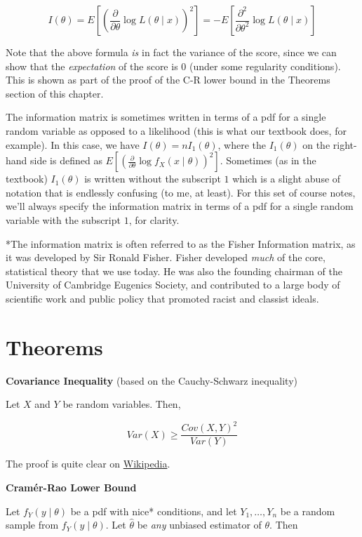 \documentclass[
  letterpaper,
  DIV=11,
  numbers=noendperiod]{scrreprt}
\begin{document}
\[
I(\theta) = E \left[ \left( \frac{\partial}{\partial \theta} \log L(\theta \mid x) \right)^2\right] = -E\left[ \frac{\partial^2}{\partial \theta^2} \log L(\theta \mid x)\right]
\]

Note that the above formula \emph{is} in fact the variance of the score,
since we can show that the \emph{expectation} of the score is 0 (under
some regularity conditions). This is shown as part of the proof of the
C-R lower bound in the Theorems section of this chapter.

The information matrix is sometimes written in terms of a pdf for a
single random variable as opposed to a likelihood (this is what our
textbook does, for example). In this case, we have
\(I(\theta) = n I_1(\theta)\), where the \(I_1(\theta)\) on the
right-hand side is defined as
\(E \left[ \left( \frac{\partial}{\partial \theta} \log f_X(x \mid \theta) \right)^2\right]\).
Sometimes (as in the textbook) \(I_1(\theta)\) is written without the
subscript \(1\) which is a slight abuse of notation that is endlessly
confusing (to me, at least). For this set of course notes, we'll always
specify the information matrix in terms of a pdf for a single random
variable with the subscript \(1\), for clarity.

*The information matrix is often referred to as the Fisher Information
matrix, as it was developed by Sir Ronald Fisher. Fisher developed
\emph{much} of the core, statistical theory that we use today. He was
also the founding chairman of the University of Cambridge Eugenics
Society, and contributed to a large body of scientific work and public
policy that promoted racist and classist ideals.

\hypertarget{theorems-3}{%
\section{Theorems}\label{theorems-3}}

\textbf{Covariance Inequality} (based on the Cauchy-Schwarz inequality)

Let \(X\) and \(Y\) be random variables. Then,

\[
Var(X) \geq \frac{Cov(X, Y)^2}{Var(Y)}
\]

The proof is quite clear on
\href{https://en.wikipedia.org/wiki/Cauchy\%E2\%80\%93Schwarz_inequality}{Wikipedia}.

\textbf{Cramér-Rao Lower Bound}

Let \(f_Y(y \mid \theta)\) be a pdf with nice* conditions, and let
\(Y_1, \dots, Y_n\) be a random sample from \(f_Y(y \mid \theta)\). Let
\(\hat{\theta}\) be \emph{any} unbiased estimator of \(\theta\). Then
\end{document}
